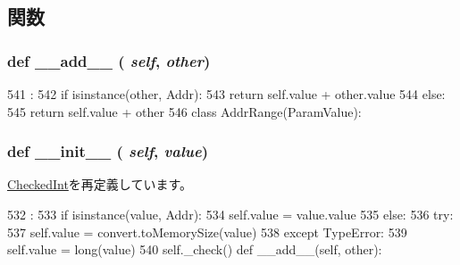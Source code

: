 \subsection{関数}
\hypertarget{classm5_1_1params_1_1Addr_ae92943b217d29a45ddcbbba2f7208afc}{
\subsubsection[{\_\-\_\-add\_\-\_\-}]{\setlength{\rightskip}{0pt plus 5cm}def \_\-\_\-add\_\-\_\- ( {\em self}, \/   {\em other})}}
\label{classm5_1_1params_1_1Addr_ae92943b217d29a45ddcbbba2f7208afc}



\begin{DoxyCode}
541                             :
542         if isinstance(other, Addr):
543             return self.value + other.value
544         else:
545             return self.value + other
546 
class AddrRange(ParamValue):
\end{DoxyCode}
\hypertarget{classm5_1_1params_1_1Addr_ac775ee34451fdfa742b318538164070e}{
\subsubsection[{\_\-\_\-init\_\-\_\-}]{\setlength{\rightskip}{0pt plus 5cm}def \_\-\_\-init\_\-\_\- ( {\em self}, \/   {\em value})}}
\label{classm5_1_1params_1_1Addr_ac775ee34451fdfa742b318538164070e}


\hyperlink{classm5_1_1params_1_1CheckedInt_ac775ee34451fdfa742b318538164070e}{CheckedInt}を再定義しています。


\begin{DoxyCode}
532                              :
533         if isinstance(value, Addr):
534             self.value = value.value
535         else:
536             try:
537                 self.value = convert.toMemorySize(value)
538             except TypeError:
539                 self.value = long(value)
540         self._check()
    def __add__(self, other):
\end{DoxyCode}


